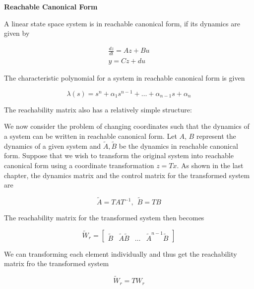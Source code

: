 \begin{framed}
\theoremstyle{remark}
\begin{remark}{\textbf{Reachable Canonical Form}}

A linear state space system is in reachable canonical form, if its dynamics are given by

\begin{eqnarray}
\frac{dz}{dt} = Az + Bu \\
y=Cz + du
\end{eqnarray}

\end{remark}
\end{framed}

The characteristic polynomial for a system in reachable canonical form is given

\begin{equation}
\lambda(s) = s^n +\alpha_1s^{n-1}+ \dots + \alpha_{n-1}s + \alpha_n
\end{equation}

The reachability matrix also has a relatively simple structure:

We now consider the problem of changing coordinates such that the dynamics
of a system can be written in reachable canonical form. Let $A$, $B$ represent the
dynamics of a given system and $\tilde{A}, \tilde{B}$ be the dynamics in reachable canonical form.
Suppose that we wish to transform the original system into reachable canonical
form using a coordinate transformation $z = Tx$. As shown in the last chapter, the
dynamics matrix and the control matrix for the transformed system are

\begin{equation}
\tilde{A} = TAT^{-1}, ~~ \tilde{B} = TB
\end{equation}

The reachability matrix for the transformed system then becomes

\begin{equation}
\tilde{W}_r = \begin{bmatrix}
 \tilde{B} & \tilde{A}\tilde{B} & \ldots & \tilde{A}^{n-1}\tilde{B} 
\end{bmatrix}
\end{equation}

We can transforming each element individually and thus get the reachability matrix fro the transformed system

\begin{equation}
\tilde{W}_r = TW_r
\end{equation}

